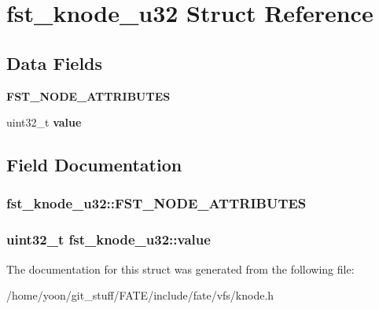 \hypertarget{structfst__knode__u32}{\section{fst\-\_\-knode\-\_\-u32 Struct Reference}
\label{structfst__knode__u32}
}
\subsection*{Data Fields}
\begin{DoxyCompactItemize}
\item 
\hypertarget{structfst__knode__u32_ae1e34ba3ec19b2ab9ecc50d07cbcf5b4}{{\bfseries F\-S\-T\-\_\-\-N\-O\-D\-E\-\_\-\-A\-T\-T\-R\-I\-B\-U\-T\-E\-S}}\label{structfst__knode__u32_ae1e34ba3ec19b2ab9ecc50d07cbcf5b4}

\item 
\hypertarget{structfst__knode__u32_a2464e4b0c89445e8ee5e0dbf94eca451}{uint32\-\_\-t {\bfseries value}}\label{structfst__knode__u32_a2464e4b0c89445e8ee5e0dbf94eca451}

\end{DoxyCompactItemize}


\subsection{Field Documentation}
\hypertarget{structfst__knode__u32_ae1e34ba3ec19b2ab9ecc50d07cbcf5b4}{
\subsubsection[{F\-S\-T\-\_\-\-N\-O\-D\-E\-\_\-\-A\-T\-T\-R\-I\-B\-U\-T\-E\-S}]{\setlength{\rightskip}{0pt plus 5cm}fst\-\_\-knode\-\_\-u32\-::\-F\-S\-T\-\_\-\-N\-O\-D\-E\-\_\-\-A\-T\-T\-R\-I\-B\-U\-T\-E\-S}}\label{structfst__knode__u32_ae1e34ba3ec19b2ab9ecc50d07cbcf5b4}
\hypertarget{structfst__knode__u32_a2464e4b0c89445e8ee5e0dbf94eca451}{
\subsubsection[{value}]{\setlength{\rightskip}{0pt plus 5cm}uint32\-\_\-t fst\-\_\-knode\-\_\-u32\-::value}}\label{structfst__knode__u32_a2464e4b0c89445e8ee5e0dbf94eca451}


The documentation for this struct was generated from the following file\-:\begin{DoxyCompactItemize}
\item 
/home/yoon/git\-\_\-stuff/\-F\-A\-T\-E/include/fate/vfs/knode.\-h\end{DoxyCompactItemize}
